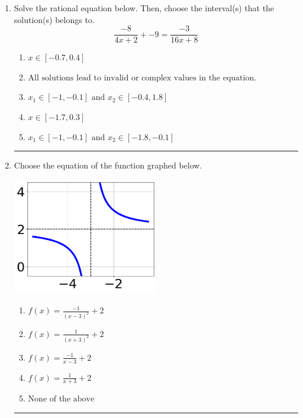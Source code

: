 \documentclass[14pt]{extbook}
\newcommand{\litem}[1]{\item#1\hspace*{-1cm}\rule{\textwidth}{0.4pt}}
\begin{document}
\begin{enumerate}
{\begin{enumerate}[label=\Alph*.]
\end{enumerate} }
\litem{
Solve the rational equation below. Then, choose the interval(s) that the solution(s) belongs to.\[ \frac{-8}{4x + 2} + -9 = \frac{-3}{16x + 8} \]\begin{enumerate}[label=\Alph*.]
\item \( x \in [-0.7,0.4] \)
\item \( \text{All solutions lead to invalid or complex values in the equation.} \)
\item \( x_1 \in [-1, -0.1] \text{ and } x_2 \in [-0.4,1.8] \)
\item \( x \in [-1.7,0.3] \)
\item \( x_1 \in [-1, -0.1] \text{ and } x_2 \in [-1.8,-0.1] \)

\end{enumerate} }
\litem{
Choose the equation of the function graphed below.
\begin{center}
    \includegraphics[width=0.5\textwidth]{../Figures/rationalGraphToEquationCopyB.png}
\end{center}
\begin{enumerate}[label=\Alph*.]
\item \( f(x) = \frac{-1}{(x - 3)^2} + 2 \)
\item \( f(x) = \frac{1}{(x + 3)^2} + 2 \)
\item \( f(x) = \frac{-1}{x - 3} + 2 \)
\item \( f(x) = \frac{1}{x + 3} + 2 \)
\item \( \text{None of the above} \)


\end{enumerate}}
\end{enumerate}
\end{document}
